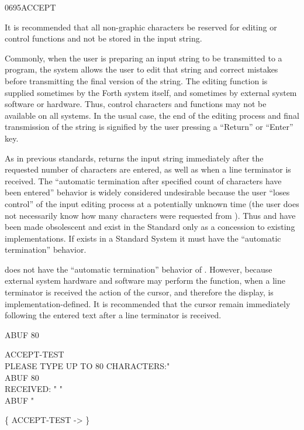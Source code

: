 \begin{worddef}{0695}{ACCEPT}
\begin{defer}
		It is recommended that all non-graphic characters be reserved
		for editing or control functions and not be stored in the input
		string.

		Commonly, when the user is preparing an input string to be
		transmitted to a program, the system allows the user to edit
		that string and correct mistakes before transmitting the final
		version of the string. The editing function is supplied
		sometimes by the Forth system itself, and sometimes by external
		system software or hardware. Thus, control characters and
		functions may not be available on all systems. In the usual
		case, the end of the editing process and final transmission of
		the string is signified by the user pressing a ``Return'' or
		``Enter'' key.

		As in previous standards,  returns the input
		string immediately after the requested number of characters
		are entered, as well as when a line terminator is received.
		The ``automatic termination after specified count of characters
		have been entered'' behavior is widely considered undesirable
		because the user ``loses control'' of the input editing process
		at a potentially unknown time (the user does not necessarily
		know how many characters were requested from ).
		Thus  and  have been made obsolescent
		and exist in the Standard only as a concession to existing
		implementations. If  exists in a Standard System
		it must have the ``automatic termination'' behavior.

		 does not have the ``automatic termination''
		behavior of . However, because external system
		hardware and software may perform the  function,
		when a line terminator is received the action of the cursor,
		and therefore the display, is implementation-defined. It is
		recommended that the cursor remain immediately following the
		entered text after a line terminator is received.

	\testing
		 ABUF 80  

		\word{:} ACCEPT-TEST \\
		\tab[2]   PLEASE TYPE UP TO 80 CHARACTERS:"  \\
		\tab[2] ABUF 80  \\
		\tab[2]   RECEIVED: " \word{[CHAR]} "  \\
		\tab[2] ABUF   \word{[CHAR]} "   \\
		\word{;}

		\{ ACCEPT-TEST -> \}
	\end{defer}
\end{worddef}


